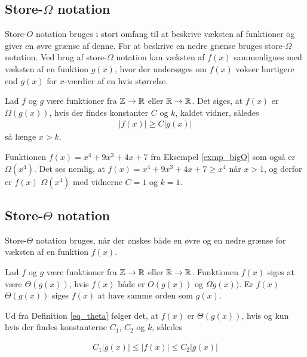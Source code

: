\subsection{Store-$\Omega$ notation}
Store-$O$ notation bruges i stort omfang til at beskrive væksten af funktioner og giver en øvre grænse af denne. 
For at beskrive en nedre grænse bruges store-$\Omega$ notation.
Ved brug af store-$\Omega$ notation kan væksten af $f(x)$ sammenlignes med væksten af en funktion $g(x)$, hvor der undersøges om $f(x)$ vokser hurtigere end $g(x)$ for $x$-værdier af en hvis størrelse.

\begin{defn}
	Lad $f$ og $g$ være funktioner fra $\mathbb{Z} \to \mathbb{R}$ eller $\mathbb{R} \to \mathbb{R}$. 
	Det siges, at $f(x)$ er $\Omega(g(x))$, hvis der findes konstanter $C$ og $k$, kaldet vidner, således 
	\begin{align*}
		|f(x)| \geq C |g(x)|
	\end{align*}
så længe $x>k$.
\end{defn}

\begin{exmp}\label{exmp_theta}
Funktionen $f(x)=x^4+9x^3+4x+7$ fra Eksempel \ref{exmp_bigO} som også er $\Omega(x^4)$. 
Det ses nemlig, at $f(x)=x^4+9x^3+4x+7 \geq x^4 $ når $x>1$, og derfor er $f(x)$ $\Omega(x^4)$ med vidnerne $C=1$ og $k=1$.
\end{exmp}

\subsection{Store-$\Theta$ notation}
Store-$\Theta$ notation bruges, når der ønskes både en øvre og en nedre grænse for væksten af en funktion $f(x)$. \\

\begin{defn}\label{eq_theta}
	Lad $f$ og $g$ være funktioner fra $\mathbb{Z} \to \mathbb{R}$ eller $\mathbb{R} \to \mathbb{R}$. 
Funktionen $f(x)$ siges at være $\Theta (g(x))$, hvis $f(x)$ både er $O(g(x))$ og $\Omega g(x))$. 
	Er $f(x)$ $\Theta (g(x))$ siges $f(x)$ at have samme orden som $g(x)$. 
\end{defn}

Ud fra Definition \ref{eq_theta} følger det, at $f(x)$ er $\Theta (g(x))$, hvis og kun hvis der findes konstanterne $C_1$, $C_2$ og $k$, således

\begin{align*}
	C_1 |g(x)| \leq |f(x)| \leq C_2 |g(x)|
\end{align*}

